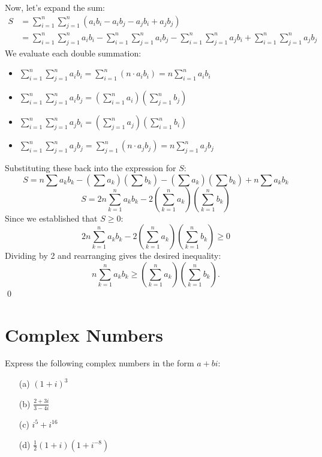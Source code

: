 Now, let's expand the sum:
\begin{align*}
S &= \sum_{i=1}^n \sum_{j=1}^n (a_i b_i - a_i b_j - a_j b_i + a_j b_j) \\
&= \sum_{i=1}^n \sum_{j=1}^n a_i b_i - \sum_{i=1}^n \sum_{j=1}^n a_i b_j - \sum_{i=1}^n \sum_{j=1}^n a_j b_i + \sum_{i=1}^n \sum_{j=1}^n a_j b_j
\end{align*}
We evaluate each double summation:
\begin{itemize}
\item \( \sum_{i=1}^n \sum_{j=1}^n a_i b_i = \sum_{i=1}^n \left( n \cdot a_i b_i \right) = n \sum_{i=1}^n a_i b_i \)
\item \( \sum_{i=1}^n \sum_{j=1}^n a_i b_j = \left( \sum_{i=1}^n a_i \right) \left( \sum_{j=1}^n b_j \right) \)
\item \( \sum_{i=1}^n \sum_{j=1}^n a_j b_i = \left( \sum_{j=1}^n a_j \right) \left( \sum_{i=1}^n b_i \right) \)
\item \( \sum_{i=1}^n \sum_{j=1}^n a_j b_j = \sum_{j=1}^n \left( n \cdot a_j b_j \right) = n \sum_{j=1}^n a_j b_j \)
\end{itemize}
Substituting these back into the expression for $S$:
\[
S = n \sum a_k b_k - \left(\sum a_k\right)\left(\sum b_k\right) - \left(\sum a_k\right)\left(\sum b_k\right) + n \sum a_k b_k
\]
\[
S = 2n \sum_{k=1}^n a_k b_k - 2 \left( \sum_{k=1}^n a_k \right) \left( \sum_{k=1}^n b_k \right)
\]
Since we established that $S \geq 0$:
\[
2n \sum_{k=1}^n a_k b_k - 2 \left( \sum_{k=1}^n a_k \right) \left( \sum_{k=1}^n b_k \right) \geq 0
\]
Dividing by 2 and rearranging gives the desired inequality:
\[
n \sum_{k=1}^n a_k b_k \geq \left( \sum_{k=1}^n a_k \right) \left( \sum_{k=1}^n b_k \right).
\]\qed

\section{Complex Numbers}

\begin{problembox}
\begin{problemstatement}
Express the following complex numbers in the form \( a + bi \):

\begin{enumerate}
\item[(a)] \( (1 + i)^3 \)
\item[(b)] \( \frac{2 + 3i}{3 - 4i} \)
\item[(c)] \( i^5 + i^{16} \)
\item[(d)] \( \frac{1}{2}(1 + i)(1 + i^{-8}) \)
\end{enumerate}
\end{problemstatement}
\end{problembox}

